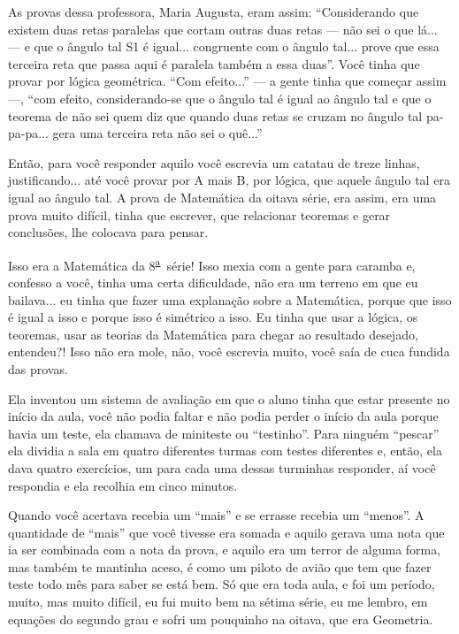 \documentclass{hipatia}
\newcommand{\superau}{\textsuperscript{\underline{a}}~}
\begin{document}
As provas dessa professora, Maria Augusta, eram assim: ``Considerando
que existem duas retas paralelas que cortam outras duas retas --- não sei
o que lá... --- e que o ângulo tal S1 é igual... congruente com o ângulo
tal... prove que essa terceira reta que passa aqui é paralela também a
essa duas''. Você tinha que provar por lógica geométrica. ``Com
efeito...'' --- a gente tinha que começar assim ---, ``com efeito,
considerando-se que o ângulo tal é igual ao ângulo tal e que o teorema
de não sei quem diz que quando duas retas se cruzam no ângulo tal
pa-pa-pa... gera uma terceira reta não sei o quê...''

Então, para você responder aquilo você escrevia um catatau de treze
linhas, justificando... até você provar por A mais B, por lógica, que
aquele ângulo tal era igual ao ângulo tal. A prova de Matemática da
oitava série, era assim, era uma prova muito difícil, tinha que
escrever, que relacionar teoremas e gerar conclusões, lhe colocava para
pensar.

Isso era a Matemática da 8\superau  série! Isso mexia com a gente para caramba e,
confesso a você, tinha uma certa dificuldade, não era um terreno em que
eu bailava... eu tinha que fazer uma explanação sobre a Matemática,
porque que isso é igual a isso e porque isso é simétrico a isso. Eu
tinha que usar a lógica, os teoremas, usar as teorias da Matemática para
chegar ao resultado desejado, entendeu?! Isso não era mole, não, você
escrevia muito, você saía de cuca fundida das provas.

Ela inventou um sistema de avaliação em que o aluno tinha que estar
presente no início da aula, você não podia faltar e não podia perder o
início da aula porque havia um teste, ela chamava de miniteste ou
``testinho''. Para ninguém ``pescar'' ela dividia a sala em quatro
diferentes turmas com testes diferentes e, então, ela dava quatro
exercícios, um para cada uma dessas turminhas responder, aí você
respondia e ela recolhia em cinco minutos.

Quando você acertava recebia um ``mais'' e se errasse recebia um
``menos''. A quantidade de ``mais'' que você tivesse era somada e aquilo
gerava uma nota que ia ser combinada com a nota da prova, e aquilo era
um terror de alguma forma, mas também te mantinha aceso, é como um
piloto de avião que tem que fazer teste todo mês para saber se está bem.
Só que era toda aula, e foi um período, muito, mas muito difícil, eu fui
muito bem na sétima série, eu me lembro, em equações do segundo grau e
sofri um pouquinho na oitava, que era Geometria.
\end{document}
